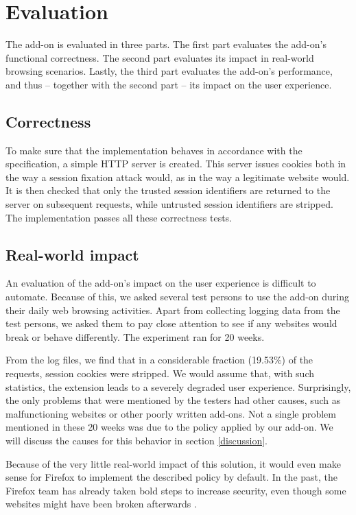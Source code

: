 \section{Evaluation}\label{evaluation}

The add-on is evaluated in three parts. The first part evaluates the add-on's functional correctness. The second part evaluates its impact in real-world browsing scenarios. Lastly, the third part evaluates the add-on's performance, and thus -- together with the second part -- its impact on the user experience.

\subsection{Correctness}

To make sure that the implementation behaves in accordance with the specification, a simple HTTP server is created. This server issues cookies both in the way a session fixation attack would, as in the way a legitimate website would. It is then checked that only the trusted session identifiers are returned to the server on subsequent requests, while untrusted session identifiers are stripped. The implementation passes all these correctness tests.

\subsection{Real-world impact}

An evaluation of the add-on's impact on the user experience is difficult to automate. Because of this, we asked several test persons to use the add-on during their daily web browsing activities. Apart from collecting logging data from the test persons, we asked them to pay close attention to see if any websites would break or behave differently. The experiment ran for 20 weeks.

From the log files, we find that in a considerable fraction (19.53\%) of the requests, session cookies were stripped. We would assume that, with such statistics, the extension leads to a severely degraded user experience. Surprisingly, the only problems that were mentioned by the testers had other causes, such as malfunctioning websites or other poorly written add-ons. Not a single problem mentioned in these 20 weeks was due to the policy applied by our add-on. We will discuss the causes for this behavior in section \ref{discussion}.

Because of the very little real-world impact of this solution, it would even make sense for Firefox to implement the described policy by default. In the past, the Firefox team has already taken bold steps to increase security, even though some websites might have been broken afterwards \cite{Singh2010,MozillaXmlHttp,Bonne2011}.

